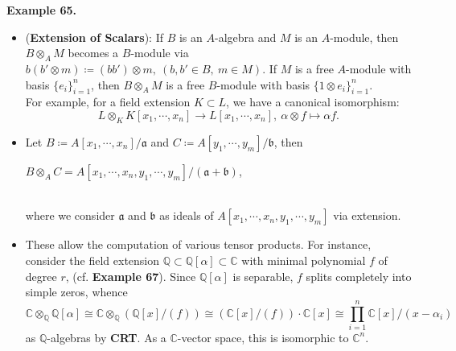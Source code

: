 \documentclass[12pt,a4paper,footinclude=true,headinclude=true]{scrbook} %
\newenvironment{example}[2][Example]
    { \begin{mdframed}[backgroundcolor=gray!20] \textbf{#1 #2.} }
    {  \end{mdframed}}
\begin{document}
\begin{example}{65}
    \begin{itemize}
        \item[(a)] (\textbf{Extension of Scalars}): If $B$ is an $A$-algebra and $M$ is an $A$-module, then $B\otimes_AM$ becomes a $B$-module via $b(b'\otimes m)\coloneqq(bb')\otimes m,\ (b,b'\in B,\ m\in M)$. If $M$ is a free $A$-module with basis $\{e_i\}_{i=1}^n$, then $B\otimes_AM$ is a free $B$-module with basis $\{1\otimes e_i\}_{i=1}^n$.\\
        For example, for a field extension $K\subset L$, we have a canonical isomorphism:
        \begin{equation*}
            L\otimes_KK[x_1,\cdots,x_n]\longrightarrow L[x_1,\cdots,x_n],\ \alpha\otimes f\longmapsto\alpha f.
        \end{equation*}
        \item[(b)] Let $B\coloneqq A[x_1,\cdots,x_n]/\mathfrak{a}$ and $C\coloneqq A[y_1,\cdots,y_m]/\mathfrak{b}$, then \\ \centerline{$B\otimes_AC=A[x_1,\cdots,x_n,y_1,\cdots,y_m]/(\mathfrak{a}+\mathfrak{b})$,}\\ where we consider $\mathfrak{a}$ and $\mathfrak{b}$ as ideals of $A[x_1,\cdots,x_n,y_1,\cdots,y_m]$ via extension.
        \item[(c)] These allow the computation of various tensor products. For instance, consider the field extension $\mathbb{Q}\subset\mathbb{Q}[\alpha]\subset\mathbb{C}$ with minimal polynomial $f$ of degree $r$, (cf. \textbf{Example 67}). Since $\mathbb{Q}[\alpha]$ is separable, $f$ splits completely into simple zeros, whence
        \begin{equation*}
            \mathbb{C}\otimes_{\mathbb{Q}}\mathbb{Q}[\alpha]\cong
            \mathbb{C}\otimes_{\mathbb{Q}}(\mathbb{Q}[x]/(f))\cong
            (\mathbb{C}[x]/(f))\cdot\mathbb{C}[x]\cong
            \prod_{i=1}^n\mathbb{C}[x]/(x-\alpha_i)
        \end{equation*}
        as $\mathbb{Q}$-algebras by \textbf{CRT}. As a $\mathbb{C}$-vector space, this is isomorphic to $\mathbb{C}^n$.
    \end{itemize}
\end{example}

\newpage
\end{document}
